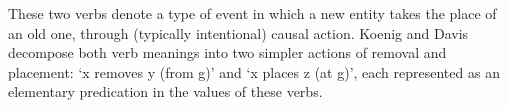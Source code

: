 \documentclass[output=paper
                ,modfonts
                ,nonflat
	        ,collection
	        ,collectionchapter
	        ,collectiontoclongg
 	        ,biblatex
                ,babelshorthands
                ,newtxmath
                ,draftmode
                ,colorlinks, citecolor=brown
]{./langsci/langscibook}
\begin{document}
These two verbs denote a type of event in which a new entity takes the place of an old one, through (typically intentional) causal action.
Koenig and Davis decompose both verb meanings into two simpler actions of removal and placement: `x removes y (from g)' and `x places z (at g)', each represented as an elementary predication in the  values of these verbs.  


\end{document}
